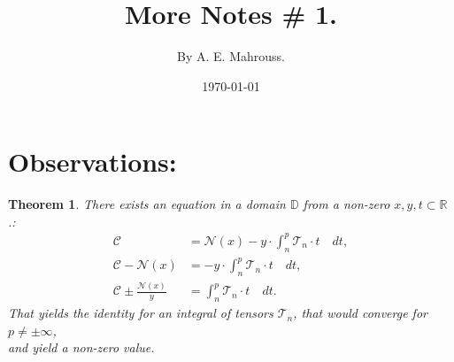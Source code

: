 \documentclass[10pt]{article}
\title{%
	\vspace{-1.5em}%
	\large\textbf{More Notes \# 1.}%
}
\author{By A. E. Mahrouss.}
\date{\today}
\theoremstyle{plain}
\newtheorem{theorem}{Theorem}[section]
\theoremstyle{definition}
\theoremstyle{remark}
\begin{document}
	
	\maketitle
	\tableofcontents
	\newpage

\section{Observations:}

\begin{theorem}
There exists an equation in a domain $\mathbb{D}$ from a non-zero $x, y, t \subset \mathbb{R}$.:
\begin{align*}
    \mathcal{C} &= \mathcal{N}(x) - y \cdot \int_{n}^{p} \mathcal{T}_{n} \cdot t \quad dt,\\
    \mathcal{C} - \mathcal{N}(x) &= -y \cdot \int_{n}^{p} \mathcal{T}_{n} \cdot t \quad dt,\\
    \mathcal{C} \pm \frac{\mathcal{N}(x)}{y} &= \int_{n}^{p} \mathcal{T}_{n} \cdot t \quad dt.
\end{align*}
That yields the identity for an integral of tensors $\mathcal{T}_n$, that would converge for $p \neq \pm \infty$,\\ and yield a non-zero value.
\end{theorem}

\nocite{*}


\end{document}
